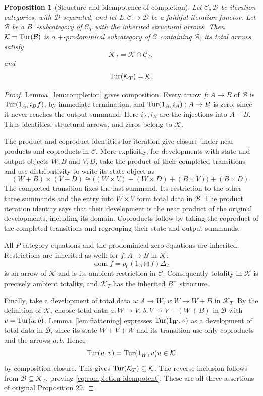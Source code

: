 \documentclass[11pt]{article}
\newtheorem{proposition}[theorem]{Proposition}
\newcommand{\C}{\mathcal C}\newcommand{\D}{\mathcal D}\newcommand{\B}{\mathcal B}
\newcommand{\dom}{\operatorname{dom}}\newcommand{\ran}{\operatorname{ran}}
\begin{document}
\begin{proposition}[Structure and idempotence of completion]
\label{prop:completion-idempotent}
Let $\C,\D$ be iteration categories, with $\D$ separated, and let
$L:\C\to\D$ be a faithful iteration functor. Let $\B$ be a
$B^+$-subcategory of $\C_T$ with the inherited structural arrows.
Then $\mathcal K=\Tur(\B)$ is a $+$-prodominical subcategory of
$\C$ containing $\B$, its total arrows satisfy
\[
\mathcal K_T=\mathcal K\cap\C_T,
\]
and
\begin{equation}\label{eq:completion-idempotent}
\operatorname{Tur}(\mathcal K_T)=\mathcal K.
\end{equation}
\end{proposition}
\begin{proof}
Lemma~\ref{lem:completion} gives composition. Every arrow
$f:A\to B$ of $\B$ is $\operatorname{Tur}(1_A,i_Bf)$, by immediate
termination, and $\operatorname{Tur}(1_A,i_A):A\to B$ is zero, since it never
reaches the output summand. Here $i_A,i_B$ are the injections into $A+B$. Thus identities, structural arrows,
and zeros belong to $\mathcal K$.

The product and coproduct identities for iteration give closure under
near products and coproducts in $\C$. More explicitly, for developments
with state and output objects $W,B$ and $V,D$, take the product of
their completed transitions and use distributivity to write its state
object as
\[
(W+B)\times(V+D)
\cong\bigl((W\times V)+(W\times D)+(B\times V)\bigr)+(B\times D).
\]
The completed transition fixes the last summand. Its restriction to
the other three summands and the entry into $W\times V$ form total
data in $\B$. The product iteration identity says that their
development is the near product of the original developments,
including its domain. Coproducts follow by taking the coproduct of
the completed transitions and regrouping their state and output
summands.

All $P$-category equations and the prodominical zero equations are
inherited. Restrictions are inherited as well: for $f:A\to B$ in
$\mathcal K$,
\[
\dom f=p_0(1_A\boxtimes f)\Delta_A
\]
is an arrow of $\mathcal K$ and is its ambient restriction in $\C$.
Consequently totality in $\mathcal K$ is precisely ambient totality,
and $\mathcal K_T$ has the inherited $B^+$ structure.

Finally, take a development of total data
$u:A\to W$, $v:W\to W+B$ in $\mathcal K_T$. By the definition of
$\mathcal K$, choose total data $a:W\to V$,
$b:V\to V+(W+B)$ in $\B$ with $v=\operatorname{Tur}(a,b)$.
Lemma~\ref{lem:flattening} expresses $\operatorname{Tur}(1_W,v)$ as a development
of total data in $\B$, since its state $W+V+W$ and its transition
use only coproducts and the arrows $a,b$. Hence
\[
\operatorname{Tur}(u,v)=\operatorname{Tur}(1_W,v)u\in\mathcal K
\]
by composition closure. This gives
$\operatorname{Tur}(\mathcal K_T)\subseteq\mathcal K$. The reverse inclusion
follows from $\B\subseteq\mathcal K_T$, proving
\eqref{eq:completion-idempotent}. These are all three assertions of
original Proposition 29.
\end{proof}
\end{document}
